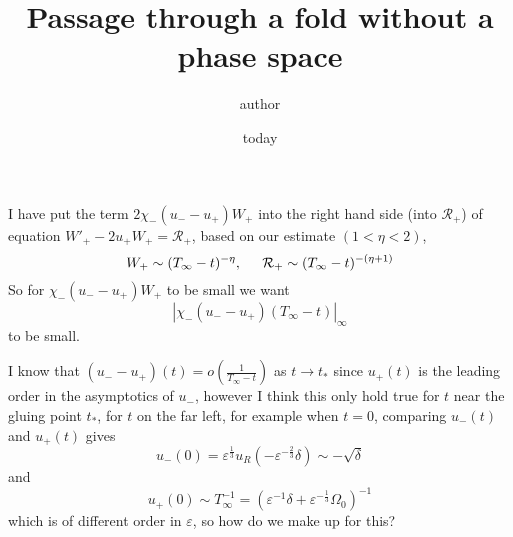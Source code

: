 \documentclass[letterpaper,11pt]{article}
\title{Passage through a fold without a phase space}
\author{author}
\date{today}
\newcommand{\eps}{\varepsilon}
\numberwithin{equation}{section}
\theoremstyle{plain}
\begin{document}
I have put the term $2\chi_-(u_- - u_+)W_+$ into the right hand side (into $\mathcal{R}_+$) 
of equation $W'_+ - 2u_+ W_+ = \mathcal{R}_+$, based on our estimate $(1<\eta<2)$,
\[
W_+ \sim (T_\infty - t)^{-\eta}, \hspace{0.2in} \mathcal{R}_+ \sim (T_\infty - t)^{-(\eta+1)}
\]
So for $\chi_-(u_- - u_+)W_+$ to be small we want
\[
|\chi_-(u_- - u_+)(T_\infty -t)|_\infty
\]
to be small.


I know that $(u_ - -u_+)(t) = o( \frac{1}{T_\infty -t} )$ as $t \to t_*$ since $u_+(t)$ is the leading order in the asymptotics of $u_-$, however I think this only hold true for $t$ near the gluing point $t_*$, for $t$ on the far left, for example when $t=0$, comparing $u_-(t)$ and $u_+(t)$ gives
\[
u_-(0) = \eps^{\frac{1}{3}}u_R( - \eps^{-\frac{2}{3}}\delta) \sim -\sqrt{\delta}
\] 
and 
\[
u_+(0) \sim T_\infty^{-1} = (\eps^{-1}\delta + \eps^{-\frac{1}{3}}\Omega_0)^{-1} 
\]
which is of different order in $\eps$, so how do we make up for this?
\end{document}
